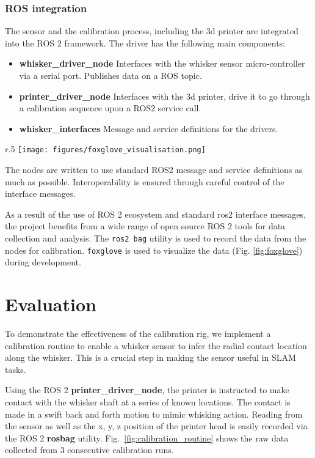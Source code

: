 \documentclass[runningheads]{llncs}
\begin{document}
\subsubsection{ROS integration}

The sensor and the calibration process, including the 3d printer are integrated into the ROS 2 framework. The driver has the following main components:

\begin{itemize}
    \item \textbf{whisker\_driver\_node} Interfaces with the whisker sensor micro-controller via a serial port. Publishes data on a ROS topic.
    \item \textbf{printer\_driver\_node} Interfaces with the 3d printer, drive it to go through a calibration sequence upon a ROS2 service call.
    \item \textbf{whisker\_interfaces} Message and service definitions for the drivers.
\end{itemize}

\begin{wrapfigure}{r}{.5\textwidth}
    \centering
    \texttt{[image: figures/foxglove\_visualisation.png]}
    \caption{Foxglove visualization of whisker sensor system running in ROS 2}
    \label{fig:foxglove}
\end{wrapfigure}

The nodes are written to use standard ROS2 message and service definitions as much as possible. Interoperability is ensured through careful control of the interface messages.

As a result of the use of ROS 2 ecosystem and standard ros2 interface messages, the project benefits from a wide range of open source ROS 2 tools for data collection and analysis. The \verb|ros2 bag| utility is used to record the data from the nodes for calibration. \verb|foxglove| is used to visualize the data (Fig. \ref{fig:foxglove}) during development.

\section{Evaluation}

To demonstrate the effectiveness of the calibration rig, we implement a calibration routine to enable a whisker sensor to infer the radial contact location along the whisker. This is a crucial step in making the sensor useful in SLAM tasks. 

Using the ROS 2 \textbf{printer\_driver\_node}, the printer is instructed to make contact with the whisker shaft at a series of known locations. The contact is made in a swift back and forth motion to mimic whisking action. Reading from the sensor as well as the x, y, z position of the printer head is easily recorded via the ROS 2 \textbf{rosbag} utility. Fig.~\ref{fig:calibration_routine} shows the raw data collected from 3 consecutive calibration runs.
\end{document}
